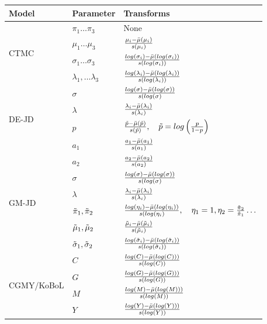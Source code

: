 \documentclass[onefignum,onetabnum]{siamonline190516}
\begin{document}
\begin{table}[h!]
\centering

\small
\begin{threeparttable}
\begin{tabular}{lll}
 \toprule
 Model & Parameter & Transforms\\
 \midrule
 \multirow{4}{*}{CTMC}
 & $\pi_1 \dots \pi_3$ & None \tnote{1} \\
 & $\mu_1 \dots \mu_3$ & $\frac{\mu_i - \bar{\mu}(\mu_i)}{s(\mu_i)}$ \\
 &$\sigma_1 \dots \sigma_3$ & $\frac{log(\sigma_i) - \bar{\mu}(log(\sigma_i))}{s(log(\sigma_i))}$ \\
 & $\lambda_1, \dots \lambda_3$ & $\frac{log(\lambda_i)- \bar{\mu}(log(\lambda_i))}{s(log(\lambda_i))}$ \\
  \midrule
  
  \multirow{4}{*}{DE-JD}
  & $\sigma$ & $\frac{log(\sigma) - \bar{\mu}(log(\sigma))} {s(log(\sigma)}$ \\
 & $\lambda$ & $\frac{\lambda_i - \bar{\mu}(\lambda_i)}{s(\lambda_i)}$ \\
 &$p$ & $\frac{\tilde{p} - \bar{\mu}(\tilde{p})}{s(\tilde{p})}, \quad \tilde{p} = log \left( \frac{p}{1-p}\right)$ \\
 & $a_1$ & $\frac{a_1 - \bar{\mu}(a_1)}{s(a_1)}$ \\
 & $a_2$ & $\frac{a_2 - \bar{\mu}(a_2)}{s(a_2)}$ \\
   \midrule
  
  \multirow{4}{*}{GM-JD}
  & $\sigma$ & $\frac{log(\sigma) - \bar{\mu}(log(\sigma))} {s(log(\sigma)}$ \\
 & $\lambda$ & $\frac{\lambda_i - \bar{\mu}(\lambda_i)}{s(\lambda_i)}$ \\
 &$\tilde{\pi}_1, \tilde{\pi}_2$ & $\frac{log(\eta_i) - \bar{\mu}(log(\eta_i))}{s(log(\eta_i)}, \quad \eta_1 = 1, \eta_2 = \frac{\tilde{\pi}_2}{\tilde{\pi}_1} \dots$ \\
 & $\tilde{\mu}_1, \tilde{\mu}_2$ & $\frac{\tilde{\mu}_i - \bar{\mu}(\tilde{\mu}_i)}{s(\tilde{\mu}_i)}$ \\
 & $\tilde{\sigma}_1, \tilde{\sigma}_2$ & $\frac{log(\tilde{\sigma}_i) - \bar{\mu}(log(\tilde{\sigma}_i))}{s(log(\tilde{\sigma}_i))}$ \\
   \midrule
  
  \multirow{4}{*}{CGMY/KoBoL}
 & $C$ & $\frac{log(C) - \bar{\mu}(log(C)))}{s(log(C))}$ \\
 & $G$ & $\frac{log(G) - \bar{\mu}(log(G)))}{s(log(G))}$ \\
 & $M$ & $\frac{log(M) - \bar{\mu}(log(M)))}{s(log(M))}$ \\
 & $Y$ & $\frac{log(Y) - \bar{\mu}(log(Y)))}{s(log(Y))}$ \\


\end{tabular}
\end{threeparttable}
\end{table}
\end{document}
